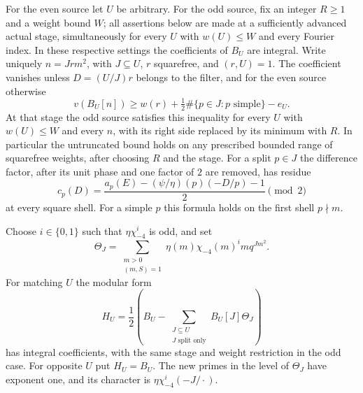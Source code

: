 \begin{lemma}\label{co:operators}
For the even source let $U$ be arbitrary.  For the odd source, fix
an integer $R\ge1$ and a weight bound $W$; all assertions below are
made at a sufficiently advanced actual stage, simultaneously for every
$U$ with $w(U)\le W$ and every Fourier index.
In these respective settings the coefficients of $B_U$ are integral.
Write uniquely
$n=Jrm^2$, with $J\subseteq U$, $r$ squarefree, and $(r,U)=1$.
The coefficient vanishes unless $D=(U/J)r$ belongs to the filter,
and for the even source otherwise
\begin{equation}\label{co:BU-bound}
 v(B_U[n])\geq w(r)+\tfrac12\#\{p\in J:p\text{ simple}\}-e_U.
\end{equation}
At that stage the odd source satisfies this inequality for every
$U$ with $w(U)\le W$ and every $n$, with its right side replaced
by its minimum with $R$.
In particular the untruncated bound holds on any prescribed bounded
range of squarefree weights, after choosing $R$ and the stage.
For a split $p\in J$ the difference factor, after its unit phase and
one factor of $2$ are removed, has residue
\begin{equation}\label{co:cp}
 c_p(D)=\frac{a_p(E)-(\psi/\eta)(p)(-D/p)-1}{2}\pmod2
\end{equation}
at every square shell.  For a simple $p$ this formula holds on the
first shell $p\nmid m$.

Choose $i\in\{0,1\}$ such that $\eta\chi_{-4}^i$ is odd, and set
\[
 \Theta_J=\sum_{\substack{m>0\\(m,S)=1}}
              \eta(m)\chi_{-4}(m)^i m q^{Jm^2}.
\]
For matching $U$ the modular form
\begin{equation}\label{co:HU}
 H_U=\frac12\left(B_U-
       \sum_{\substack{J\subseteq U\\J\text{ split only}}}
                 B_U[J]\Theta_J\right)
\end{equation}
has integral coefficients, with the same stage and weight restriction
in the odd case.  For opposite $U$ put $H_U=B_U$.
The new primes in the level of $\Theta_J$ have exponent one, and its
character is $\eta\chi_{-4}^i(-J/\cdot)$.
\end{lemma}

